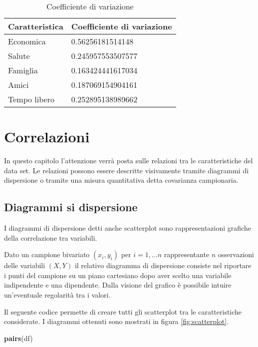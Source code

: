 \documentclass[]{book}
\newenvironment{Shaded}{\begin{snugshade}}{\end{snugshade}}
\newcommand{\KeywordTok}[1]{\textcolor[rgb]{0.13,0.29,0.53}{\textbf{#1}}}
\newcommand{\NormalTok}[1]{#1}
\begin{document}
\begin{table}

\caption{\label{tab:coefficiente-variazione}Coefficiente di variazione}
\centering
\begin{tabular}[t]{l|l}
\hline
Caratteristica & Coefficiente di variazione\\
\hline
Economica & 0.56256181514148\\
\hline
Salute & 0.245957553507577\\
\hline
Famiglia & 0.163424441617034\\
\hline
Amici & 0.187069154904161\\
\hline
Tempo libero & 0.252895138989662\\
\hline
\end{tabular}
\end{table}

\chapter{Correlazioni}\label{correlazioni}

In questo capitolo l'attenzione verrà posta sulle relazioni tra le
caratteristiche del data set. Le relazioni possono essere descritte
visivamente tramite diagrammi di dispersione o tramite una misura
quantitativa detta covarianza campionaria.

\section{Diagrammi si dispersione}\label{diagrammi-si-dispersione}

I diagrammi di dispersione detti anche scatterplot sono rappresentazioni
grafiche della correlazione tra variabili.

Dato un campione bivariato \((x_i, y_i)\) per \(i=1,...n\)
rappresentante \(n\) osservazioni delle variabili \((X, Y)\) il relativo
diagramma di dispersione consiste nel riportare i punti del campione su
un piano cartesiano dopo aver scelto una variabile indipendente e una
dipendente. Dalla visione del grafico è possibile intuire un'eventuale
regolarità tra i valori.

Il seguente codice permette di creare tutti gli scatterplot tra le
caratteristiche considerate. I diagrammi ottenuti sono mostrati in
figura \ref{fig:scatterplot}.

\begin{Shaded}
\begin{Highlighting}[]
\KeywordTok{pairs}\NormalTok{(df)}
\end{Highlighting}
\end{Shaded}
\end{document}
